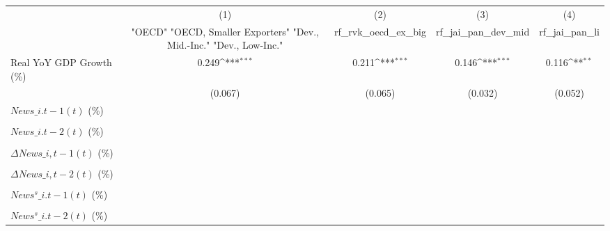 {
\def\sym#1{\ifmmode^{#1}\else\(^{#1}\)\fi}
\begin{tabular}{l*{4}{c}}
\toprule
                    &\multicolumn{1}{c}{(1)}&\multicolumn{1}{c}{(2)}&\multicolumn{1}{c}{(3)}&\multicolumn{1}{c}{(4)}\\
                    &\multicolumn{1}{c}{ "OECD" "OECD, Smaller Exporters" "Dev., Mid.-Inc." "Dev., Low-Inc."}&\multicolumn{1}{c}{rf\_rvk\_oecd\_ex\_big}&\multicolumn{1}{c}{rf\_jai\_pan\_dev\_mid}&\multicolumn{1}{c}{rf\_jai\_pan\_li}\\
\midrule
Real YoY GDP Growth (\%)&       0.249\sym{***}&       0.211\sym{***}&       0.146\sym{***}&       0.116\sym{**} \\
                    &     (0.067)         &     (0.065)         &     (0.032)         &     (0.052)         \\
\addlinespace
$ News\_{i.t-1}(t)$ (\%)&                     &                     &                     &                     \\
                    &                     &                     &                     &                     \\
\addlinespace
$ News\_{i.t-2}(t)$ (\%)&                     &                     &                     &                     \\
                    &                     &                     &                     &                     \\
\addlinespace
$ \Delta News\_{i,t-1}(t)$ (\%)&                     &                     &                     &                     \\
                    &                     &                     &                     &                     \\
\addlinespace
$ \Delta News\_{i,t-2}(t)$ (\%)&                     &                     &                     &                     \\
                    &                     &                     &                     &                     \\
\addlinespace
$ News^s\_{i.t-1}(t)$ (\%)&                     &                     &                     &                     \\
                    &                     &                     &                     &                     \\
\addlinespace
$ News^s\_{i.t-2}(t)$ (\%)&                     &                     &                     &                     \\

\end{tabular}}

